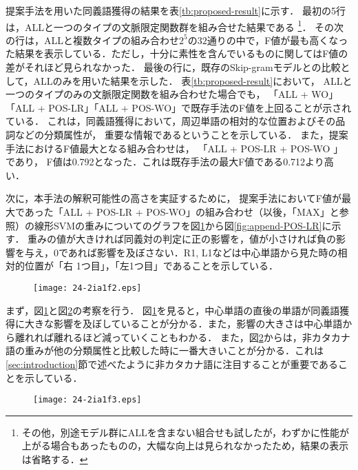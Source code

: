 \documentclass[japanese]{jnlp_1.4}
\begin{document}
提案手法を用いた同義語獲得の結果を表\ref{tb:proposed-result}に示す．
最初の5行は，ALLと一つのタイプの文脈限定関数群を組み合せた結果である
\footnote{その他，別途モデル群にALLを含まない組合せも試したが，わずかに性能が上がる場合もあったものの，大幅な向上は見られなかったため，結果の表示は省略する．}．
その次の行は，ALLと複数タイプの組み合わせ$2^5$の$32$通りの中で，F値が最も高くなった結果を表示している．ただし，十分に素性を含んでいるものに関してはF値の差がそれほど見られなかった．
最後の行に，既存のSkip-gramモデルとの比較として，ALLのみを用いた結果を示した．
表\ref{tb:proposed-result}において，
ALLと一つのタイプのみの文脈限定関数を組み合わせた場合でも，
「ALL + WO」「ALL + POS-LR」「ALL + POS-WO」で既存手法のF値を上回ることが示されている．
これは，同義語獲得において，周辺単語の相対的な位置およびその品詞などの分類属性が，
重要な情報であるということを示している．
また，提案手法におけるF値最大となる組み合わせは，
「ALL + POS-LR + POS-WO 」であり，
F値は0.792となった．これは既存手法の最大F値である0.712より高い．

次に，本手法の解釈可能性の高さを実証するために，
提案手法においてF値が最大であった「ALL + POS-LR + POS-WO」の組み合わせ（以後，「MAX」と参照）の線形SVMの重みについてのグラフを図\ref{fig:WOMAX-weight}から図\ref{fig:append-POS-LR}に示す．
重みの値が大きければ同義対の判定に正の影響を，値が小さければ負の影響を与え，0であれば影響を及ぼさない．R1, L1などは中心単語から見た時の相対的位置が「右 1つ目」，「左1つ目」であることを示している．

\begin{figure}[b]
\begin{center}
\texttt{[image: 24-2ia1f2.eps]}
\end{center}
\label{fig:WOMAX-weight}
\end{figure}

まず，図\ref{fig:WOMAX-weight}と図\ref{fig:POSMAX-weight}の考察を行う．
図\ref{fig:WOMAX-weight}を見ると，中心単語の直後の単語が同義語獲得に大きな影響を及ぼしていることが分かる．また，影響の大きさは中心単語から離れれば離れるほど減っていくこともわかる．
また，図\ref{fig:POSMAX-weight}からは，非カタカナ語の重みが他の分類属性と比較した時に一番大きいことが分かる．これは\ref{sec:introduction}節で述べたように非カタカナ語に注目することが重要であることを示している．

\begin{figure}[b]
\begin{center}
\texttt{[image: 24-2ia1f3.eps]}
\end{center}
\label{fig:POSMAX-weight}
\end{figure}
\end{document}
